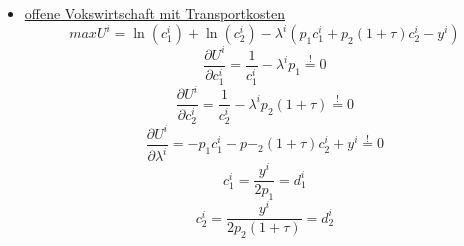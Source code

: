 \begin{itemize}
\item \underline{offene Vokswirtschaft mit Transportkosten}
\begin{equation} maxU^i=\ln(c^i_1)+\ln(c^i_2)-\lambda^i (p_1c^i_1+p_2(1+\tau)c^i_2-y^i)\end{equation}
\begin{equation}\frac{\partial U^i}{\partial c^i_1}=\frac{1}{c^i_1}-\lambda^i p_1\overset{!}{=}0\end{equation}
\begin{equation} \frac{\partial U^i}{\partial c^i_2}=\frac{1}{c^i_2}-\lambda^i p_2(1+\tau)\overset{!}{=}0\end{equation}
\begin{equation} \frac{\partial U^i}{\partial \lambda^i}=-p_1c^i_1-p-_2(1+\tau)c^i_2+y^i\overset{!}{=}0\end{equation}
\begin{equation} c^i_1=\frac{y^i}{2p_1}=d^i_1\end{equation}
\begin{equation} c^i_2=\frac{y^i}{2p_2(1+\tau)}=d^i_2\end{equation}
\end{itemize}

